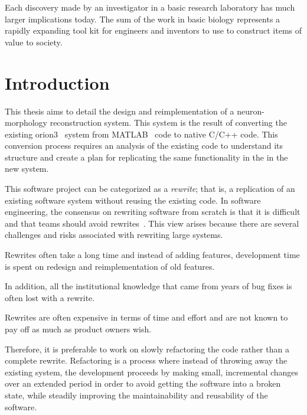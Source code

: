\begin{savequote}[0.55\linewidth]
	\begin{fancyquote}
		Each discovery made by an investigator in a basic research
		laboratory has much larger implications today. The sum of the work in basic
		biology represents a rapidly expanding tool kit for engineers and inventors to
		use to construct items of value to society.
	\end{fancyquote}
\end{savequote}
\chapter{Introduction}\label{ch:introduction}


This thesis aims to detail the design and reimplementation of a
neuron-morphology reconstruction system. This system is the result of
converting the existing \gls{orion3}~\autocite{ORION_Santamaria-Pang2015} system from
MATLAB~\autocite{MATLAB:2013a} code to native C/C++ code.
This conversion process requires an analysis of the existing code
to understand its structure and create a plan for replicating the
same functionality in the in the new system.

This software project can be categorized as a \emph{rewrite}; that
is, a replication of an existing software system without
reusing the existing code. In software engineering, the consensus
on rewriting software from scratch is that it is difficult and
that teams should avoid rewrites~\autocite{Software-rewrites:Spolsky:2000}. This view
arises because there are several challenges and risks associated
with rewriting large systems.
\begin{itemize*}[label={}]
\item Rewrites often take a long time and instead of adding
	features, development time is spent on redesign and
	reimplementation of old features.
\item In addition, all the institutional knowledge that came from
	years of bug fixes is often lost with a rewrite.
\item Rewrites are often expensive in terms of time and effort and
	are not known to pay off as much as product owners wish.
\end{itemize*}
Therefore, it is preferable to work on slowly refactoring the code
rather than a complete rewrite. Refactoring is a process where
instead of throwing away the existing system, the development
proceeds by making small, incremental changes over an extended
period in order to avoid getting the software into a broken state,
while steadily improving the maintainability and reusability of the
software.

